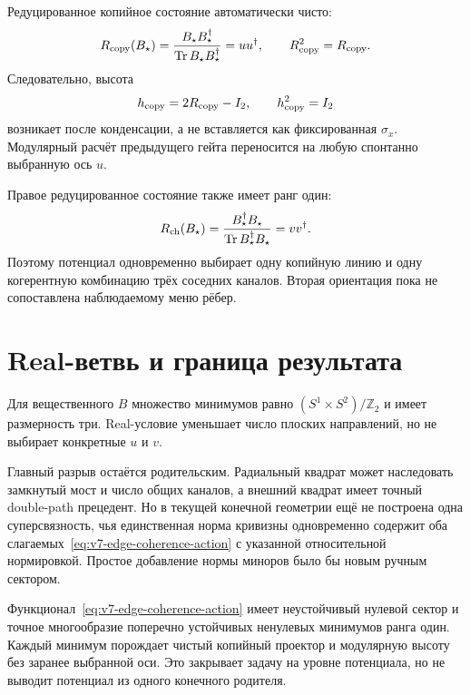 Редуцированное копийное состояние автоматически чисто:
\begin{equation}
 R_{\rm copy}(B_\star)
 =\frac{B_\star B_\star^\dagger}{\operatorname{Tr} B_\star B_\star^\dagger}
 =uu^\dagger,
 \qquad R_{\rm copy}^2=R_{\rm copy}.
 \label{eq:v7-edge-coherence-copy-projector}
\end{equation}
Следовательно, высота
\begin{equation}
 h_{\rm copy}=2R_{\rm copy}-I_2,
 \qquad h_{\rm copy}^2=I_2
 \label{eq:v7-edge-coherence-height}
\end{equation}
возникает после конденсации, а не вставляется как фиксированная
$\sigma_x$. Модулярный расчёт предыдущего гейта переносится на любую
спонтанно выбранную ось $u$.

Правое редуцированное состояние также имеет ранг один:
\begin{equation}
 R_{\rm ch}(B_\star)
 =\frac{B_\star^\dagger B_\star}{\operatorname{Tr} B_\star^\dagger B_\star}
 =vv^\dagger.
 \label{eq:v7-edge-coherence-channel-projector}
\end{equation}
Поэтому потенциал одновременно выбирает одну копийную линию и одну
когерентную комбинацию трёх соседних каналов. Вторая ориентация пока не
сопоставлена наблюдаемому меню рёбер.

\section{Real-ветвь и граница результата}

Для вещественного $B$ множество минимумов равно
$(S^1\times S^2)/\mathbb Z_2$ и имеет размерность три. Real-условие уменьшает
число плоских направлений, но не выбирает конкретные $u$ и $v$.

Главный разрыв остаётся родительским. Радиальный квадрат может наследовать
замкнутый мост и число общих каналов, а внешний квадрат имеет точный
double-path прецедент. Но в текущей конечной геометрии ещё не построена одна
суперсвязность, чья единственная норма кривизны одновременно содержит оба
слагаемых~\eqref{eq:v7-edge-coherence-action} с указанной относительной
нормировкой. Простое добавление нормы миноров было бы новым ручным сектором.

\begin{theorem}
Функционал~\eqref{eq:v7-edge-coherence-action} имеет неустойчивый нулевой
сектор и точное многообразие поперечно устойчивых ненулевых минимумов ранга
один. Каждый минимум порождает чистый копийный проектор и модулярную высоту
без заранее выбранной оси. Это закрывает задачу на уровне потенциала, но не
выводит потенциал из одного конечного родителя.
\end{theorem}

